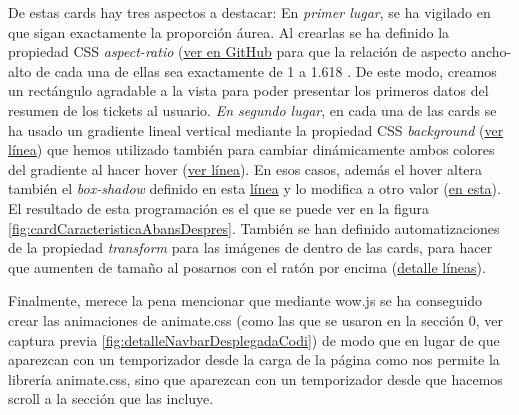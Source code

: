 \documentclass[a4paper,12pt]{report}
\begin{document}
	
	De estas cards hay tres aspectos a destacar: En \textit{primer lugar}, se ha vigilado en que sigan exactamente la proporción áurea. Al crearlas se ha definido la propiedad CSS \textit{aspect-ratio} (\href{https://github.com/blackcub3s/mercApp/blob/663360ea63eafd38c1fa052e7a994e22d7f0a5f6/APP%20WEB/__frontend__produccio__/app/css/dashboard/estils.css#L80}{ver en GitHub} para que la relación de aspecto ancho-alto de cada una de ellas sea exactamente de 1 a 1.618 \cite{wikiPropAurea}. De este modo, creamos un rectángulo agradable a la vista para poder presentar los primeros datos del resumen de los tickets al usuario. \textit{En segundo lugar}, en cada una de las cards se ha usado un gradiente lineal vertical mediante la propiedad CSS \textit{background} (\href{https://github.com/blackcub3s/mercApp/blob/663360ea63eafd38c1fa052e7a994e22d7f0a5f6/APP%20WEB/__frontend__produccio__/app/css/dashboard/estils.css#L85}{ver línea}) que hemos utilizado también para cambiar dinámicamente ambos colores del gradiente al hacer hover (\href{https://github.com/blackcub3s/mercApp/blob/663360ea63eafd38c1fa052e7a994e22d7f0a5f6/APP%20WEB/__frontend__produccio__/app/css/dashboard/estils.css#L126}{ver línea}). En esos casos, además el hover altera también el \textit{box-shadow} definido en esta \href{https://github.com/blackcub3s/mercApp/blob/663360ea63eafd38c1fa052e7a994e22d7f0a5f6/APP%20WEB/__frontend__produccio__/app/css/dashboard/estils.css#L84}{línea} y lo modifica a otro valor (\href{https://github.com/blackcub3s/mercApp/blob/663360ea63eafd38c1fa052e7a994e22d7f0a5f6/APP%20WEB/__frontend__produccio__/app/css/dashboard/estils.css#L125}{en esta}). El resultado de esta programación es el que se puede ver en la figura \ref{fig:cardCaracteristicaAbansDespres}. También se han definido automatizaciones de la propiedad \textit{transform} para las imágenes de dentro de las cards, para hacer que aumenten de tamaño al posarnos con el ratón por encima (\href{https://github.com/blackcub3s/mercApp/blob/663360ea63eafd38c1fa052e7a994e22d7f0a5f6/APP%20WEB/__frontend__produccio__/app/css/dashboard/estils.css#L106-L108}{detalle líneas}).
	
	Finalmente, merece la pena mencionar que mediante wow.js se ha conseguido crear las animaciones de animate.css (como las que se usaron en la sección 0, ver captura previa \ref{fig:detalleNavbarDesplegadaCodi}) de modo que en lugar de que aparezcan con un temporizador desde la carga de la página como nos permite la librería animate.css, sino que aparezcan con un temporizador desde que hacemos scroll a la sección que las incluye.
	
\end{document}
